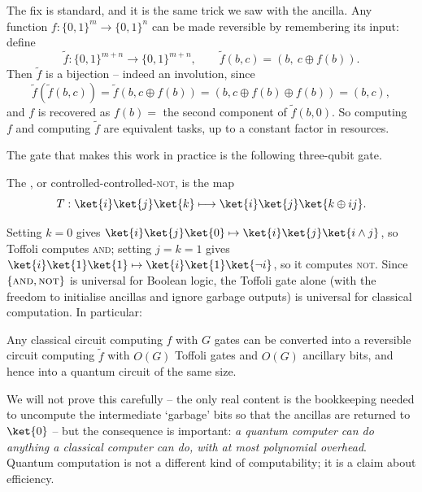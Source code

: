 The fix is standard, and it is the same trick we saw with the ancilla. Any function $f : \{0,1\}^m\to\{0,1\}^n$ can be made reversible by remembering its input: define
$$\widetilde f : \{0,1\}^{m+n}\to\{0,1\}^{m+n}, \qquad \widetilde f (b,c) = (b,\ c\oplus f(b)).$$
Then $\widetilde f$ is a bijection -- indeed an involution, since
$$\widetilde f\left(\widetilde f(b,c)\right) = \widetilde f (b, c\oplus f(b)) = (b, c\oplus f(b)\oplus f(b)) = (b,c),$$
and $f$ is recovered as $f(b) = $ the second component of $\widetilde f(b,0)$. So computing $f$ and computing $\widetilde f$ are equivalent tasks, up to a constant factor in resources.

The gate that makes this work in practice is the following three-qubit gate.

\begin{definition}
	The , or controlled-controlled-\textsc{not}, is the map
	$$T : \ket{i}\ket{j}\ket{k}\longmapsto \ket{i}\ket{j}\ket{k\oplus ij}.$$
\end{definition}

\begin{center}
\end{center}

Setting $k = 0$ gives $\ket{i}\ket{j}\ket{0}\mapsto\ket{i}\ket{j}\ket{i \wedge j}$, so Toffoli computes \textsc{and}; setting $j = k = 1$ gives $\ket{i}\ket{1}\ket{1}\mapsto\ket{i}\ket{1}\ket{\neg i}$, so it computes \textsc{not}. Since $\{\textsc{and}, \textsc{not}\}$ is universal for Boolean logic, the Toffoli gate alone (with the freedom to initialise ancillas and ignore garbage outputs) is universal for classical computation. In particular:

\begin{proposition}
	Any classical circuit computing $f$ with $G$ gates can be converted into a reversible circuit computing $\widetilde f$ with $O(G)$ Toffoli gates and $O(G)$ ancillary bits, and hence into a quantum circuit of the same size.
\end{proposition}

We will not prove this carefully -- the only real content is the bookkeeping needed to uncompute the intermediate `garbage' bits so that the ancillas are returned to $\ket{0}$ -- but the consequence is important: \emph{a quantum computer can do anything a classical computer can do, with at most polynomial overhead}. Quantum computation is not a different kind of computability; it is a claim about efficiency.


